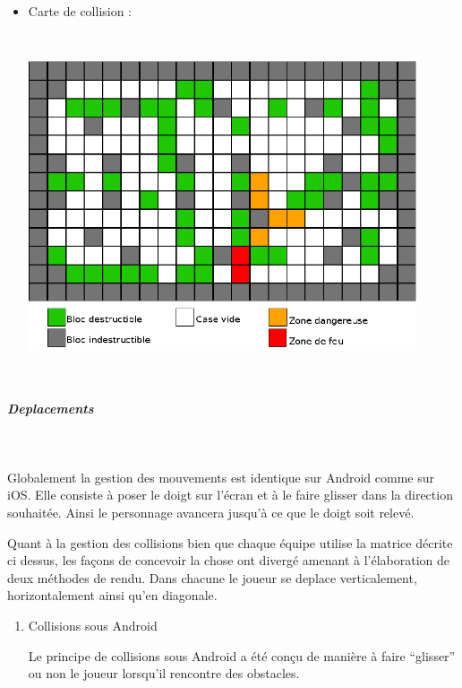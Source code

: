 {\begin{itemize}
				  \item Carte de collision :
				  
						\begin{center}						
							\includegraphics[width=115mm,height=102mm]{Developpement/Img/mapcolision_2.eps}
						\end{center}
						
				\end{itemize}
		

			\subparagraph{Deplacements\\}
			
				$\,$
			
				Globalement la gestion des mouvements est identique sur Android comme sur
				iOS.
				Elle consiste à poser le doigt sur l'écran et à le faire glisser dans la
				direction souhaitée. Ainsi le personnage avancera jusqu'à ce que le doigt
				soit relevé.				
				
				Quant à la gestion des collisions bien que chaque équipe utilise la matrice
				décrite ci dessus, les façons de concevoir la chose ont divergé amenant à
				l'élaboration de deux méthodes de rendu. Dans chacune le joueur se deplace
				verticalement, horizontalement ainsi qu'en diagonale.
				
				\begin{enumerate}
				  \item Collisions sous Android
				  
				  		Le principe de collisions sous Android a été conçu de manière à faire
				  		``glisser'' ou non le joueur lorsqu'il rencontre des obstacles.
				  		

\end{enumerate}}
